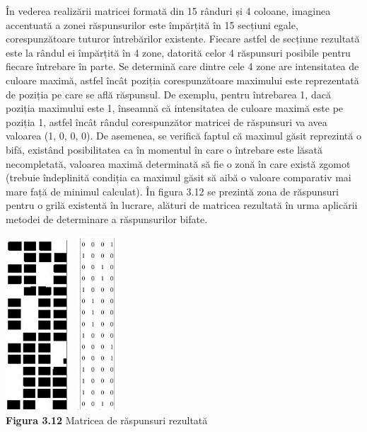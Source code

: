 \documentclass[a4paper,12pt]{report}
\newcommand\tab[1][1cm]{\hspace*{#1}}
\begin{document}
\tab În vederea realizării matricei formată din 15 rânduri și 4 coloane, imaginea accentuată a zonei răspunsurilor este împărțită în 15 secțiuni egale, corespunzătoare tuturor întrebărilor existente. Fiecare astfel de secțiune rezultată este la rândul ei împărțită în 4 zone, datorită celor 4 răspunsuri posibile pentru fiecare întrebare în parte. Se determină care dintre cele 4 zone are intensitatea de culoare maximă, astfel încât poziția corespunzătoare maximului este reprezentată de poziția pe care se află răspunsul. De exemplu, pentru întrebarea 1, dacă poziția maximului este 1, înseamnă că intensitatea de culoare maximă este pe poziția 1, astfel încât rândul corespunzător matricei de răspunsuri va avea valoarea (1, 0, 0, 0). De asemenea, se verifică faptul că maximul găsit reprezintă o bifă,  existând posibilitatea ca în momentul în care o întrebare este lăsată necompletată, valoarea maximă determinată să fie o zonă în care există zgomot (trebuie îndeplinită condiția ca maximul găsit să aibă o valoare comparativ mai mare față de minimul calculat).
În figura 3.12 se prezintă zona de răspunsuri pentru o grilă existentă în lucrare, alături de matricea rezultată în urma aplicării metodei de determinare a răspunsurilor bifate.
\begin {center} 
	\begin {footnotesize} 
		\includegraphics[width = 23mm]{fig3_12_1} 
		\includegraphics[height = 65mm,width = 20mm]{fig3_12_2} \\
		\textbf  {Figura 3.12}  Matricea de răspunsuri rezultată
	\end {footnotesize} 
\end {center}
\end{document}
